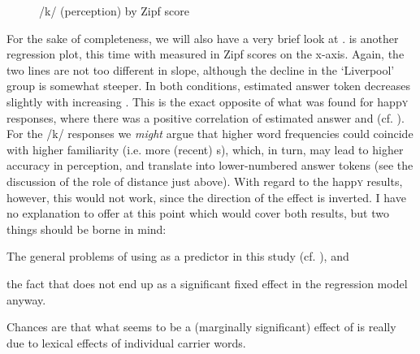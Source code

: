 \begin{figure}
	
		\resizebox{.49\linewidth}{!}{} 
	\caption{/k/ (perception) by Zipf score}
	\label{fig.scatter.k.ext.zipf}
\end{figure}

For the sake of completeness, we will also have a very brief look at .
 is another regression plot, this time with  measured in Zipf scores on the x-axis.
Again, the two lines are not too different in slope, although the decline in the `Liverpool' group is somewhat steeper.
In both  conditions, estimated answer token decreases slightly with increasing .
This is the exact opposite of what was found for happ\textsc{y} responses, where there was a positive correlation of estimated answer and  (cf. ).
For the /k/ responses we \emph{might} argue that higher word frequencies could coincide with higher familiarity (i.e. more (recent) s), which, in turn, may lead to higher accuracy in perception, and translate into lower-numbered answer tokens (see the discussion of the role of distance just above).
With regard to the happ\textsc{y} results, however, this would not work, since the direction of the effect is inverted.
I have no explanation to offer at this point which would cover both results, but two things should be borne in mind:
\begin{inparaenum}[(a)]
	\item The general problems of using  as a predictor in this study (cf. ), and
	\item the fact that  does not end up as a significant fixed effect in the regression model anyway.
\end{inparaenum}
Chances are that what seems to be a (marginally significant) effect of  is really due to lexical effects of individual carrier words.